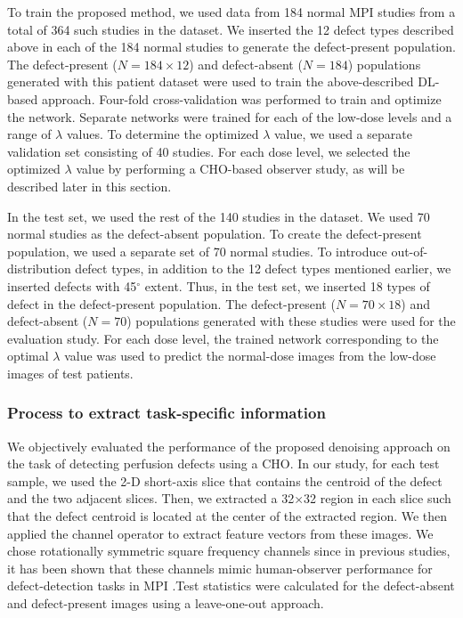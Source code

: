 \documentclass[]{spie}  %
\begin{document}
To train the proposed method, we used data from 184 normal MPI studies from a total of 364 such studies in the dataset. We inserted the 12 defect types described above in each of the 184 normal studies to generate the defect-present population. The defect-present ($N=184\times12$) and defect-absent ($N=184$) populations generated with this patient dataset were used to train the above-described DL-based approach. Four-fold cross-validation was performed to train and optimize the network. Separate networks were trained for each of the low-dose levels and a range of $\lambda$ values. To determine the optimized $\lambda$ value, we used a separate validation set consisting of 40 studies. For each dose level, we selected the optimized $\lambda$ value by performing a CHO-based observer study, as will be described later in this section.

In the test set, we used the rest of the 140 studies in the dataset. We used 70 normal studies as the defect-absent population. To create the defect-present population, we used a separate set of 70 normal studies. To introduce out-of-distribution defect types, in addition to the 12 defect types mentioned earlier, we inserted defects with 45$^{\circ}$ extent. Thus, in the test set, we inserted 18 types of defect in the defect-present population. 
The defect-present ($N=70\times18$) and defect-absent ($N=70$) populations generated with these studies were used for the evaluation study.
For each dose level, the trained network corresponding to the optimal $\lambda$ value was used to predict the normal-dose images from the low-dose images of test patients.


\subsubsection{Process to extract task-specific information}
We objectively evaluated the performance of the proposed denoising approach  on the task of detecting perfusion defects using a CHO. In our study, for each test sample, we used the 2-D short-axis slice that contains the centroid of the defect and the two adjacent slices. Then, we extracted a 32×32 region in each slice such that the defect centroid is located at the center of the extracted region. We then applied the channel operator to extract feature vectors from these images. We chose rotationally symmetric square frequency channels since in previous studies, it has been shown that these channels mimic human-observer performance for defect-detection tasks in MPI \cite{sankaran2002optimum,wollenweber1999comparison}.Test statistics were calculated for the defect-absent and defect-present images using a leave-one-out approach.
\end{document}
